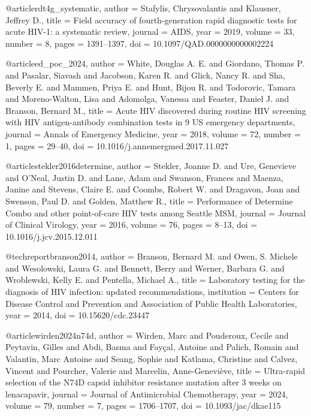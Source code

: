 @article{rdt4g_systematic,
  author  = {Stafylis, Chrysovalantis and Klausner, Jeffrey D.},
  title   = {Field accuracy of fourth-generation rapid diagnostic tests for acute {HIV-1}: a systematic review},
  journal = {AIDS},
  year    = {2019},
  volume  = {33},
  number  = {8},
  pages   = {1391--1397},
  doi     = {10.1097/QAD.0000000000002224}
}

@article{ed_poc_2024,
  author  = {White, Douglas A. E. and Giordano, Thomas P. and Pasalar, Siavash and Jacobson, Karen R. and Glick, Nancy R. and Sha, Beverly E. and Mammen, Priya E. and Hunt, Bijou R. and Todorovic, Tamara and Moreno-Walton, Lisa and Adomolga, Vanessa and Feaster, Daniel J. and Branson, Bernard M.},
  title   = {Acute {HIV} discovered during routine {HIV} screening with {HIV} antigen-antibody combination tests in 9 {US} emergency departments},
  journal = {Annals of Emergency Medicine},
  year    = {2018},
  volume  = {72},
  number  = {1},
  pages   = {29--40},
  doi     = {10.1016/j.annemergmed.2017.11.027}
}

@article{stekler2016determine,
  author  = {Stekler, Joanne D. and Ure, Genevieve and O'Neal, Justin D. and Lane, Adam and Swanson, Frances and Maenza, Janine and Stevens, Claire E. and Coombs, Robert W. and Dragavon, Joan and Swenson, Paul D. and Golden, Matthew R.},
  title   = {Performance of {Determine Combo} and other point-of-care {HIV} tests among {Seattle MSM}},
  journal = {Journal of Clinical Virology},
  year    = {2016},
  volume  = {76},
  pages   = {8--13},
  doi     = {10.1016/j.jcv.2015.12.011}
}

@techreport{branson2014,
  author      = {Branson, Bernard M. and Owen, S. Michele and Wesolowski, Laura G. and Bennett, Berry and Werner, Barbara G. and Wroblewski, Kelly E. and Pentella, Michael A.},
  title       = {Laboratory testing for the diagnosis of {HIV} infection: updated recommendations},
  institution = {Centers for Disease Control and Prevention and Association of Public Health Laboratories},
  year        = {2014},
  doi         = {10.15620/cdc.23447}
}

@article{wirden2024n74d,
  author  = {Wirden, Marc and Pouderoux, Cecile and Peytavin, Gilles and Abdi, Basma and Fay{\c{c}}al, Antoine and Palich, Romain and Valantin, Marc Antoine and Seang, Sophie and Katlama, Christine and Calvez, Vincent and Pourcher, Valerie and Marcelin, Anne-Genevi{\`e}ve},
  title   = {Ultra-rapid selection of the {N74D} capsid inhibitor resistance mutation after 3 weeks on lenacapavir},
  journal = {Journal of Antimicrobial Chemotherapy},
  year    = {2024},
  volume  = {79},
  number  = {7},
  pages   = {1706--1707},
  doi     = {10.1093/jac/dkae115}
}

